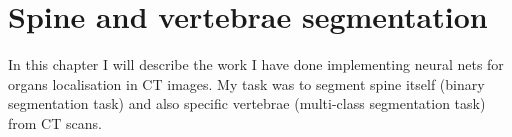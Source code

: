 \chapter{Spine and vertebrae segmentation}
\label{ch:my-approach}
In this chapter I will describe the work I have done implementing neural nets for organs localisation in CT images. My task was to segment spine itself (binary segmentation task) and also specific vertebrae (multi-class segmentation task) from CT scans.












